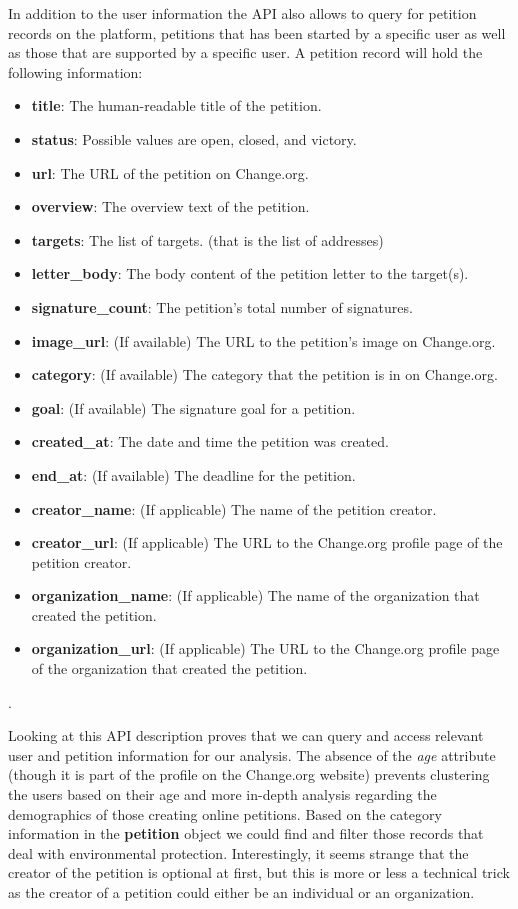 In addition to the user information the API also allows to query for petition records on the platform, petitions that has been started by a specific user as well as those that are supported by a specific user. A petition record will hold the following information:
\begin{itemize}
\item \textbf{title}: The human-readable title of the petition.
\item \textbf{status}: Possible values are open, closed, and victory.
\item \textbf{url}: The URL of the petition on Change.org.
\item \textbf{overview}: The overview text of the petition.
\item \textbf{targets}: The list of targets. (that is the list of addresses)
\item \textbf{letter\_body}: The body content of the petition letter to the target(s).
\item \textbf{signature\_count}: The petition's total number of signatures.
\item \textbf{image\_url}: (If available) The URL to the petition's image on Change.org.
\item \textbf{category}: (If available) The category that the petition is in on Change.org.
\item \textbf{goal}: (If available) The signature goal for a petition.
\item \textbf{created\_at}: The date and time the petition was created.
\item \textbf{end\_at}: (If available) The deadline for the petition.
\item \textbf{creator\_name}: (If applicable) The name of the petition creator.
\item \textbf{creator\_url}: (If applicable) The URL to the Change.org profile page of the petition creator.
\item \textbf{organization\_name}: (If applicable) The name of the organization that created the petition.
\item \textbf{organization\_url}: (If applicable) The URL to the Change.org profile page of the organization that created the petition.
\end{itemize}

\citep{Github14b}.\par\vspace{0.2cm}

Looking at this API description proves that we can query and access relevant user and petition information for our analysis. The absence of the \textit{age} attribute (though it is part of the profile on the Change.org website) prevents clustering the users based on their age and more in-depth analysis regarding the demographics of those creating online petitions. Based on the category information in the \textbf{petition} object we could find and filter those records that deal with environmental protection. Interestingly, it seems strange that the creator of the petition is optional at first, but this is more or less a technical trick as the creator of a petition could either be an individual or an organization.  

